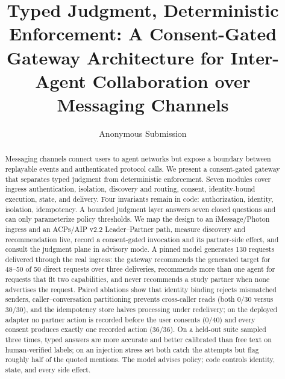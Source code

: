 \documentclass[runningheads,a4paper]{llncs}
\begin{document}
\title{Typed Judgment, Deterministic Enforcement: A Consent-Gated Gateway Architecture for Inter-Agent Collaboration over Messaging Channels}


\author{Anonymous Submission}



\maketitle

\begin{abstract}

Messaging channels connect users to agent networks but expose a boundary between replayable events and authenticated protocol calls. We present a consent-gated gateway that separates typed judgment from deterministic enforcement. Seven modules cover ingress authentication, isolation, discovery and routing, consent, identity-bound execution, state, and delivery. Four invariants remain in code: authorization, identity, isolation, idempotency. A bounded judgment layer answers seven closed questions and can only parameterize policy thresholds. We map the design to an iMessage/Photon ingress and an ACPs/AIP v2.2 Leader--Partner path, measure discovery and recommendation live, record a consent-gated invocation and its partner-side effect, and consult the judgment plane in advisory mode. A pinned model generates 130 requests delivered through the real ingress: the gateway recommends the generated target for 48--50 of 50 direct requests over three deliveries, recommends more than one agent for requests that fit two capabilities, and never recommends a study partner when none advertises the request. Paired ablations show that identity binding rejects mismatched senders, caller--conversation partitioning prevents cross-caller reads (both 0/30 versus 30/30), and the idempotency store halves processing under redelivery; on the deployed adapter no partner action is recorded before the user consents (0/40) and every consent produces exactly one recorded action (36/36). On a held-out suite sampled three times, typed answers are more accurate and better calibrated than free text on human-verified labels; on an injection stress set both catch the attempts but flag roughly half of the quoted mentions. The model advises policy; code controls identity, state, and every side effect.


\end{abstract}
\end{document}
